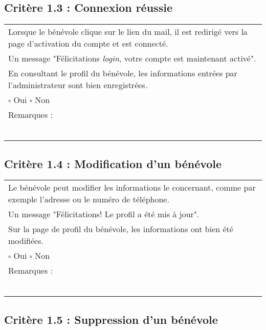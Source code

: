   	\subsection*{Critère 1.3 : Connexion réussie}
	
		\begin{center}
    	 		\begin{tabular}[h]{|p{}|}
			\hline
				Lorsque le bénévole clique sur le lien du mail, il est redirigé vers la page d'activation du compte et est connecté. \\
				Un message "Félicitations \textit{login}, votre compte est maintenant activé". \\
				En consultant le profil du bénévole, les informations entrées par l'administrateur sont bien enregistrées. \\
				
				$\square$ Oui  \hfill \hfill $\square$ Non \\\hline Remarques : \\ ~\\
			 \\\hline
     		\end{tabular}
  		\end{center}	
  		
  	\subsection*{Critère 1.4 : Modification d'un bénévole}
	
		\begin{center}
    	 		\begin{tabular}[h]{|p{}|}
			\hline
				Le bénévole peut modifier les informations le concernant, comme par exemple l'adresse ou le numéro de téléphone. \\
				Un message "Félicitations! Le profil a été mis à jour". \\
				Sur la page de profil du bénévole, les informations ont bien été modifiées. \\
				
				$\square$ Oui  \hfill \hfill $\square$ Non \\\hline Remarques : \\ ~\\
			 \\\hline
     		\end{tabular}
  		\end{center}	
  		
  	\subsection*{Critère 1.5 : Suppression d'un bénévole}
	
